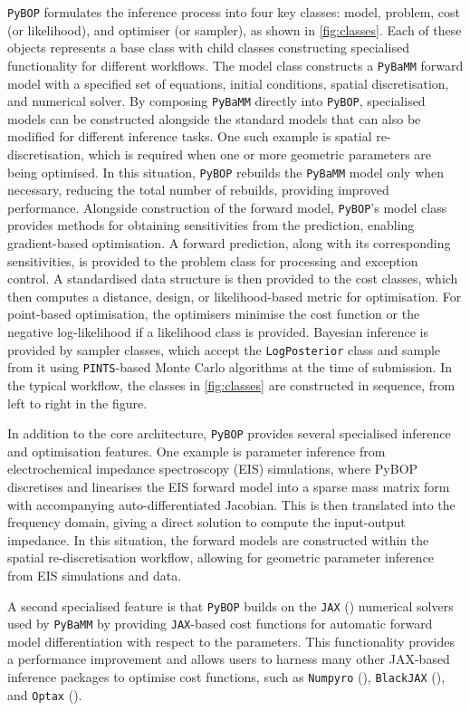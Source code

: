 \documentclass[
]{article}
\begin{document}
\texttt{PyBOP} formulates the inference process into four key classes:
model, problem, cost (or likelihood), and optimiser (or sampler), as
shown in \autoref{fig:classes}. Each of these objects represents a base
class with child classes constructing specialised functionality for
different workflows. The model class constructs a \texttt{PyBaMM}
forward model with a specified set of equations, initial conditions,
spatial discretisation, and numerical solver. By composing
\texttt{PyBaMM} directly into \texttt{PyBOP}, specialised models can be
constructed alongside the standard models that can also be modified for
different inference tasks. One such example is spatial
re-discretisation, which is required when one or more geometric
parameters are being optimised. In this situation, \texttt{PyBOP}
rebuilds the \texttt{PyBaMM} model only when necessary, reducing the
total number of rebuilds, providing improved performance. Alongside
construction of the forward model, \texttt{PyBOP}'s model class provides
methods for obtaining sensitivities from the prediction, enabling
gradient-based optimisation. A forward prediction, along with its
corresponding sensitivities, is provided to the problem class for
processing and exception control. A standardised data structure is then
provided to the cost classes, which then computes a distance, design, or
likelihood-based metric for optimisation. For point-based optimisation,
the optimisers minimise the cost function or the negative log-likelihood
if a likelihood class is provided. Bayesian inference is provided by
sampler classes, which accept the \texttt{LogPosterior} class and sample
from it using \texttt{PINTS}-based Monte Carlo algorithms at the time of
submission. In the typical workflow, the classes in
\autoref{fig:classes} are constructed in sequence, from left to right in
the figure.

In addition to the core architecture, \texttt{PyBOP} provides several
specialised inference and optimisation features. One example is
parameter inference from electrochemical impedance spectroscopy (EIS)
simulations, where PyBOP discretises and linearises the EIS forward
model into a sparse mass matrix form with accompanying
auto-differentiated Jacobian. This is then translated into the frequency
domain, giving a direct solution to compute the input-output impedance.
In this situation, the forward models are constructed within the spatial
re-discretisation workflow, allowing for geometric parameter inference
from EIS simulations and data.

A second specialised feature is that \texttt{PyBOP} builds on the
\texttt{JAX} () numerical
solvers used by \texttt{PyBaMM} by providing \texttt{JAX}-based cost
functions for automatic forward model differentiation with respect to
the parameters. This functionality provides a performance improvement
and allows users to harness many other JAX-based inference packages to
optimise cost functions, such as \texttt{Numpyro}
(), \texttt{BlackJAX}
(), and \texttt{Optax}
().
\end{document}
